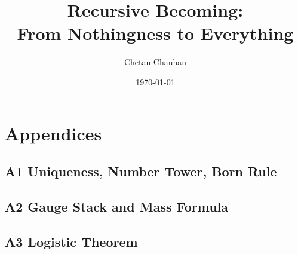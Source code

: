 \documentclass[11pt]{article}
\title{Recursive Becoming:\\From Nothingness to Everything}
\author{Chetan Chauhan}
\date{\today}
\begin{document}
\maketitle


\tableofcontents
\clearpage


















\appendix
\section*{Appendices}

\subsection*{A1 \quad Uniqueness, Number Tower, Born Rule}




\subsection*{A2 \quad Gauge Stack and Mass Formula}



\subsection*{A3 \quad Logistic Theorem}


\printbibliography
\end{document}
